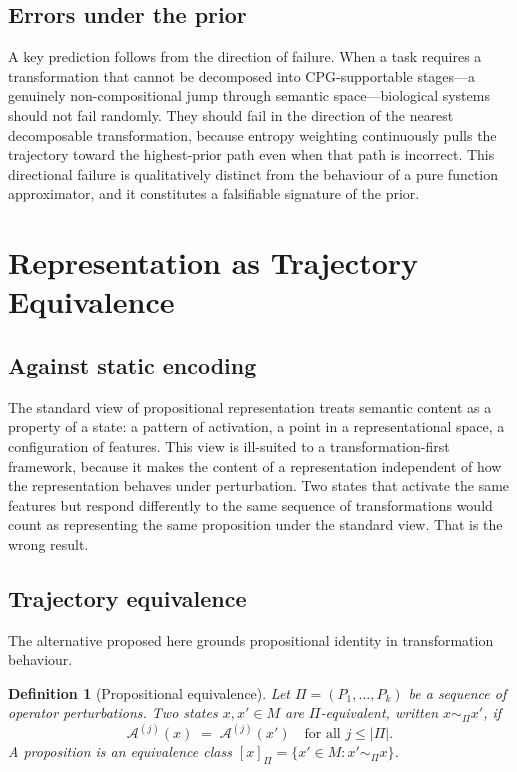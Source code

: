 \documentclass[12pt, a4paper]{article}
\newtheorem{definition}[theorem]{Definition}
\theoremstyle{remark}
\theoremstyle{definition}
\newcommand{\A}{\mathcal{A}}
\begin{document}
\subsection{Errors under the prior}

A key prediction follows from the direction of failure.  When a task requires a
transformation that cannot be decomposed into CPG-supportable stages---a genuinely
non-compositional jump through semantic space---biological systems should not fail randomly.
They should fail in the direction of the nearest decomposable transformation, because
entropy weighting continuously pulls the trajectory toward the highest-prior path even when
that path is incorrect.  This directional failure is qualitatively distinct from the
behaviour of a pure function approximator, and it constitutes a falsifiable signature of
the prior.

\section{Representation as Trajectory Equivalence}
\label{sec:representation}

\subsection{Against static encoding}

The standard view of propositional representation treats semantic content as a property of
a state: a pattern of activation, a point in a representational space, a configuration of
features.  This view is ill-suited to a transformation-first framework, because it makes
the content of a representation independent of how the representation behaves under
perturbation.  Two states that activate the same features but respond differently to the
same sequence of transformations would count as representing the same proposition under
the standard view.  That is the wrong result.

\subsection{Trajectory equivalence}

The alternative proposed here grounds propositional identity in transformation behaviour.

\begin{definition}[Propositional equivalence]
\label{def:equiv}
Let $\Pi = (P_1, \ldots, P_k)$ be a sequence of operator perturbations.  Two states
$x, x' \in M$ are \emph{$\Pi$-equivalent}, written $x \sim_\Pi x'$, if
\[
  \A^{(j)}(x) \;=\; \A^{(j)}(x') \quad \text{for all } j \le |\Pi|.
\]
A \emph{proposition} is an equivalence class $[x]_\Pi = \{x' \in M : x' \sim_\Pi x\}$.
\end{definition}
\end{document}
